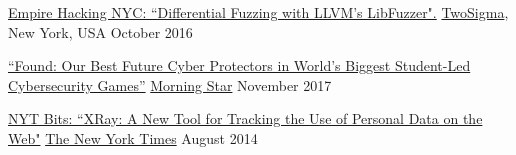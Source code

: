 \vspace{0.025in}
\begin{cvhonorswide2}
  \cvhonorwide
    {}
    {\href{https://www.meetup.com/Empire-Hacking/events/231863227/?_af=event&_af_eid=231863227&https=on}{Empire
            Hacking NYC: ``Differential Fuzzing with LLVM's LibFuzzer".}}
    {\href{https://www.twosigma.com/}{TwoSigma}, New York, USA}
    {October 2016}
\end{cvhonorswide2}

\vspace{0.025in}

\vspace{0.025in}
\begin{cvhonorswide2}
  \cvhonorwide
    {}
    {\href{https://www.morningstar.com/news/pr-news-wire/PRNews_20171114DC44382/found-our-best-future-cyber-protectors-in-worlds-biggest-studentled-cybersecurity-games.print.html}{\footnotesize``Found:
    Our Best Future Cyber Protectors
    in World's Biggest Student-Led Cybersecurity Games''}}
    {\href{https://www.morningstar.com}{Morning Star}}
    {November 2017}
\end{cvhonorswide2}
\vspace{0.025in}

\begin{cvhonorswide2}
  \cvhonorwide
    {}
    {\href{http://bits.blogs.nytimes.com/2014/08/18/xray-a-new-tool-for-tracking-the-use-of-personal-data-on-the-web/}{NYT Bits:
    ``XRay: A New Tool for Tracking the Use of Personal Data on the Web"}}
    {\href{http://www.nytimes.com/}{The New York Times}}
    {August 2014}
\end{cvhonorswide2}
